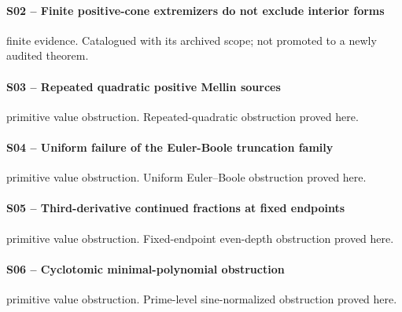 \paragraph{S02 -- Finite positive-cone extremizers do not exclude interior forms}\label{record-S02}
finite evidence. Catalogued with its archived scope; not promoted to a newly audited theorem.
\par\smallskip{}\par
\paragraph{S03 -- Repeated quadratic positive Mellin sources}\label{record-S03}
primitive value obstruction. Repeated-quadratic obstruction proved here.
\par\smallskip{}\par
\paragraph{S04 -- Uniform failure of the Euler-Boole truncation family}\label{record-S04}
primitive value obstruction. Uniform Euler--Boole obstruction proved here.
\par\smallskip{}\par
\paragraph{S05 -- Third-derivative continued fractions at fixed endpoints}\label{record-S05}
primitive value obstruction. Fixed-endpoint even-depth obstruction proved here.
\par\smallskip{}\par
\paragraph{S06 -- Cyclotomic minimal-polynomial obstruction}\label{record-S06}
primitive value obstruction. Prime-level sine-normalized obstruction proved here.
\par\smallskip{}\par
